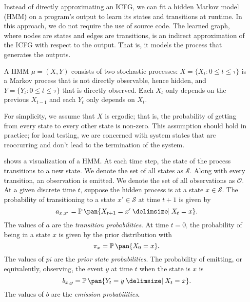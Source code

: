 Instead of directly approximating an ICFG, we can fit a hidden Markov model (HMM) on a program's output to learn its states and transitions at runtime. In this approach, we do not require the use of source code. The learned graph, where nodes are states and edges are transitions, is an indirect approximation of the ICFG with respect to the output. That is, it models the process that generates the outputs.

A HMM \(\mu = (X, Y)\) consists of two stochastic processes: \(X = \{X_t : 0 \leq t \leq \tau\}\) is a Markov process that is not directly observable, hence hidden, and \(Y = \{Y_t : 0 \leq t \leq \tau\}\) that is directly observed. Each \(X_t\) only depends on the previous \(X_{t-1}\) and each \(Y_t\) only depends on \(X_t\).

For simplicity, we assume that \(X\) is ergodic; that is, the probability of getting from every state to every other state is non-zero. This assumption should hold in practice; for load testing, we are concerned with system states that are reoccurring and don't lead to the termination of the system.

 shows a visualization of a HMM. At each time step, the state of the process transitions to a new state. We denote the set of all states as \(\mathcal{S}\). Along with every transition, an observation is emitted. We denote the set of all observations as \(\mathcal{O}\). At a given discrete time \(t\), suppose the hidden process is at a state \(x \in \mathcal{S}\). The probability of transitioning to a state \(x' \in \mathcal{S}\) at time \(t+1\) is given by
\begin{equation}\label{eq:transition}
    a_{x,x'} = \prob\pan{X_{t+1} = x' \giv X_t = x}.
\end{equation}
The values of \(a\) are the \emph{transition probabilities}. At time \(t = 0\), the probability of being in a state \(x\) is given by the prior distribution with
\begin{equation}\label{eq:prior}
    \pi_x = \prob\pan{X_0 = x}.
\end{equation}
The values of \(pi\) are the \emph{prior state probabilities}. The probability of emitting, or equivalently, observing, the event \(y\) at time \(t\) when the state is \(x\) is
\begin{equation}\label{eq:emission}
    b_{x,y} = \prob\pan{Y_t = y \giv X_t = x}.
\end{equation}
The values of \(b\) are the \emph{emission probabilities}.

